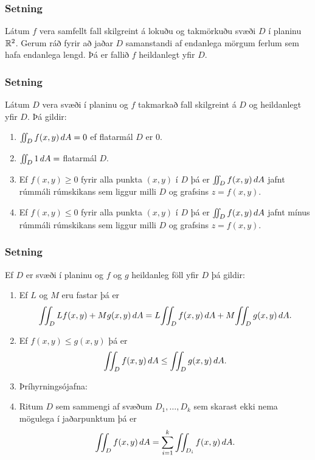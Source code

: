 \subsubsection{Setning }
Látum $f$ vera samfellt fall skilgreint á
lokuðu og takmörkuðu svæði $D$ í planinu ${\mathbb R}^2$.  Gerum ráð fyrir að
jaðar $D$ samanstandi af endanlega mörgum ferlum sem hafa endanlega
lengd.  Þá er fallið $f$ heildanlegt yfir $D$.



\subsubsection{Setning }
Látum $D$ vera svæði í planinu og $f$ takmarkað
fall skilgreint á $D$ og heildanlegt yfir $D$.  Þá gildir:

\begin {enumerate}
 \item $\int\!\!\!\int_D f(x,y)\,dA=0$ ef flatarmál $D$ er 0.
 \item $\int\!\!\!\int_D 1\,dA=$ flatarmál $D$.
 \item Ef $f(x,y)\geq 0$ fyrir alla punkta $(x,y)$ í $D$ þá er 
$\int\!\!\!\int_D f(x,y)\,dA$ jafnt rúmmáli rúmskikans sem liggur milli $D$ og
grafsins $z=f(x,y)$.
\item Ef $f(x,y)\leq 0$ fyrir alla punkta $(x,y)$ í $D$ þá er 
$\int\!\!\!\int_D f(x,y)\,dA$ jafnt mínus rúmmáli rúmskikans sem liggur milli $D$ og
grafsins $z=f(x,y)$.
\end {enumerate}




\subsubsection{Setning }
Ef $D$ er svæði í planinu og $f$ og $g$
heildanleg föll yfir $D$ þá gildir:

\begin {enumerate}
 \item  Ef $L$ og $M$ eru fastar þá er
$$\tvint_D Lf(x,y)+Mg(x,y)\,dA=L\!\tvint_D f(x,y)\,dA+M\!\tvint_D
g(x,y)\,dA.$$
\item  Ef $f(x,y)\leq g(x,y)$ þá er 
$$\int\!\!\!\int_D f(x,y)\,dA\leq \int\!\!\!\int_Dg(x,y)\,dA.$$

\item  Þríhyrningsójafna: 

\item  Ritum $D$ sem sammengi af svæðum $D_1,\ldots, D_k$ sem skarast
ekki nema mögulega í jaðarpunktum þá er
$$\int\!\!\!\int_D f(x,y)\,dA=\sum_{i=1}^k\int\!\!\!\int_{D_i}f(x,y)\,dA.$$
\end {enumerate}




